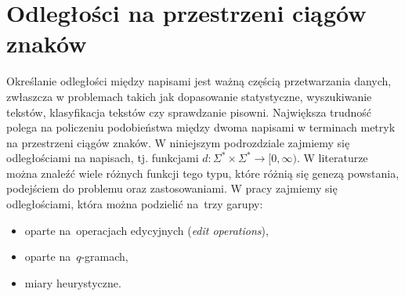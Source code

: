 \documentclass{praca1}
\begin{document}
%




\section{Odległości na przestrzeni ciągów znaków}

Określanie odległości między napisami jest ważną częścią przetwarzania danych, zwłaszcza w problemach takich jak dopasowanie statystyczne, wyszukiwanie tekstów, klasyfikacja tekstów czy sprawdzanie pisowni. Największa trudność polega na policzeniu podobieństwa między dwoma napisami w terminach metryk na przestrzeni ciągów znaków.  W niniejszym podrozdziale zajmiemy się odległościami na napisach, tj. funkcjami $d: \Sigma^* \times \Sigma^* \rightarrow [0, \infty)$. W literaturze można znaleźć wiele różnych funkcji tego typu, które różnią się genezą powstania, podejściem do problemu oraz zastosowaniami. W pracy zajmiemy się odległościami, która można podzielić na~trzy garupy:
\begin{itemize}
\item oparte na~operacjach edycyjnych (\emph{edit operations}),
\item oparte na~$q$-gramach,
\item miary heurystyczne.
\end{itemize}
\end{document}
